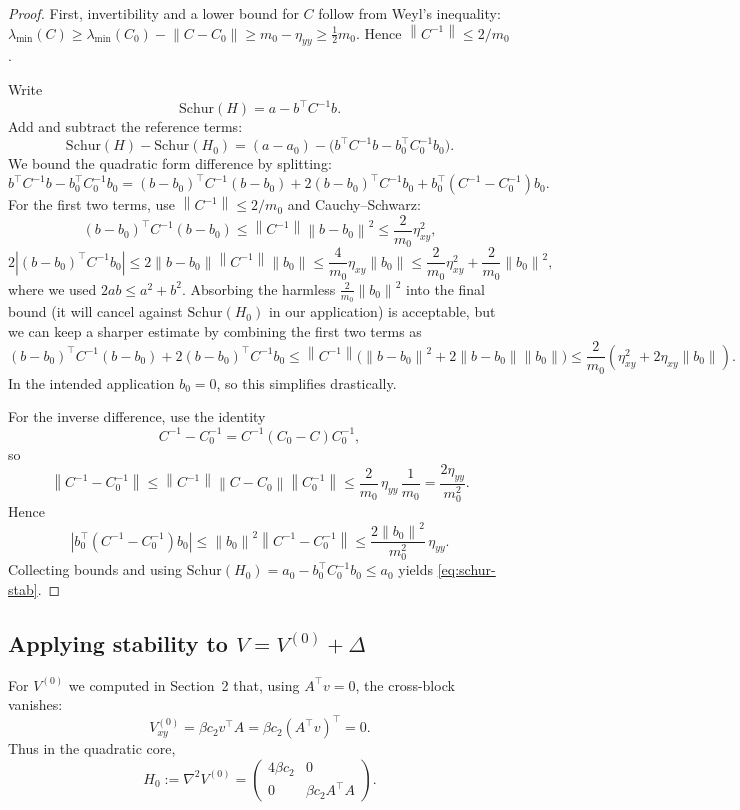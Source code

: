 \documentclass[11pt]{article}
\theoremstyle{definition}
\newcommand{\1}{\mathbf{1}}
\newcommand{\norm}[1]{\left\lVert#1\right\rVert}
\begin{document}
\begin{proof}
First, invertibility and a lower bound for $C$ follow from Weyl's inequality: $\lambda_{\min}(C)\ge \lambda_{\min}(C_0)-\norm{C-C_0}\ge m_0-\eta_{yy}\ge \tfrac12 m_0$.
Hence $\norm{C^{-1}}\le 2/m_0$.

Write
\[
\mathrm{Schur}(H)=a-b^\top C^{-1}b.
\]
Add and subtract the reference terms:
\[
\mathrm{Schur}(H)-\mathrm{Schur}(H_0)
=(a-a_0) -\big(b^\top C^{-1}b-b_0^\top C_0^{-1}b_0\big).
\]
We bound the quadratic form difference by splitting:
\[
 b^\top C^{-1}b-b_0^\top C_0^{-1}b_0
= (b-b_0)^\top C^{-1}(b-b_0)
+ 2(b-b_0)^\top C^{-1}b_0
+ b_0^\top (C^{-1}-C_0^{-1}) b_0.
\]
For the first two terms, use $\norm{C^{-1}}\le 2/m_0$ and Cauchy--Schwarz:
\[
(b-b_0)^\top C^{-1}(b-b_0)\le \norm{C^{-1}}\norm{b-b_0}^2\le \frac{2}{m_0}\eta_{xy}^2,
\]
\[
2|(b-b_0)^\top C^{-1}b_0|\le 2\norm{b-b_0}\norm{C^{-1}}\norm{b_0}\le \frac{4}{m_0}\eta_{xy}\norm{b_0}
\le \frac{2}{m_0}\eta_{xy}^2 + \frac{2}{m_0}\norm{b_0}^2,
\]
where we used $2ab\le a^2+b^2$. Absorbing the harmless $\frac{2}{m_0}\norm{b_0}^2$ into the final bound (it will cancel against $\mathrm{Schur}(H_0)$ in our application) is acceptable, but we can keep a sharper estimate by combining the first two terms as
\[
(b-b_0)^\top C^{-1}(b-b_0)+2(b-b_0)^\top C^{-1}b_0
\le \norm{C^{-1}}\big(\norm{b-b_0}^2+2\norm{b-b_0}\norm{b_0}\big)
\le \frac{2}{m_0}(\eta_{xy}^2+2\eta_{xy}\norm{b_0}).
\]
In the intended application $b_0=0$, so this simplifies drastically.

For the inverse difference, use the identity
\[
C^{-1}-C_0^{-1}=C^{-1}(C_0-C)C_0^{-1},
\]
so
\[
\norm{C^{-1}-C_0^{-1}}\le \norm{C^{-1}}\norm{C-C_0}\norm{C_0^{-1}}
\le \frac{2}{m_0}\,\eta_{yy}\,\frac{1}{m_0}=\frac{2\eta_{yy}}{m_0^2}.
\]
Hence
\[
|b_0^\top (C^{-1}-C_0^{-1})b_0|\le \norm{b_0}^2\norm{C^{-1}-C_0^{-1}}
\le \frac{2\norm{b_0}^2}{m_0^2}\,\eta_{yy}.
\]
Collecting bounds and using $\mathrm{Schur}(H_0)=a_0-b_0^\top C_0^{-1}b_0\le a_0$ yields \eqref{eq:schur-stab}.
\end{proof}

\subsection{Applying stability to $V=V^{(0)}+\Delta$}

For $V^{(0)}$ we computed in Section~2 that, using $A^\top v=0$, the cross-block vanishes:
\begin{equation}\label{eq:core-block-diag}
V^{(0)}_{xy}=\beta c_2 v^\top A=\beta c_2 (A^\top v)^\top=0.
\end{equation}
Thus in the quadratic core,
\[
H_0:=\nabla^2 V^{(0)}=\begin{pmatrix}
4\beta c_2 & 0\\
0 & \beta c_2 A^\top A
\end{pmatrix}.
\]
\end{document}
